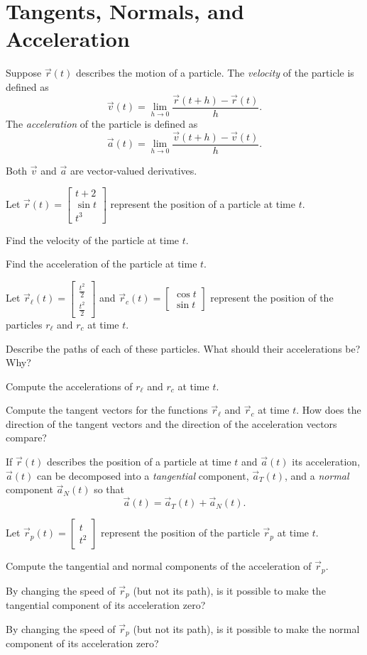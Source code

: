 \documentclass{problemset}
\newcommand{\mat}[1]{\begin{bmatrix}#1\end{bmatrix}}
\begin{document}
\section*{Tangents, Normals, and Acceleration}
	
	\begin{definition}
	Suppose $\vec r(t)$ describes the motion of a particle.  The \emph{velocity}
	of the particle is defined as
	\[
		\vec v(t) = \lim_{h\to 0} \frac{\vec r(t+h)-\vec r(t)}{h}.
	\]
	The \emph{acceleration}
	of the particle is defined as
	\[
		\vec a(t) = \lim_{h\to 0} \frac{\vec v(t+h)-\vec v(t)}{h}.
	\]
	\end{definition}
	Both $\vec v$ and $\vec a$ are vector-valued derivatives.

	\question
	Let $\vec r(t) = \mat{t+2\\ \sin t\\ t^3}$ represent the position of a particle at time $t$.
	\begin{parts}
		\item Find the velocity of the particle at time $t$.
		\item Find the acceleration of the particle at time $t$.
	\end{parts}

	\question
	Let $\vec r_\ell(t) = \mat{\frac{t^2}{2}\\\frac{t^2}{2}}$ and $\vec r_c(t) = \mat{\cos t\\ \sin t}$ represent the position
	of the particles $r_\ell$ and $r_c$ at time $t$.
	\begin{parts}
		\item Describe the paths of each of these particles.  What should their accelerations be?  Why?
		\item Compute the accelerations of $r_\ell$ and $r_c$ at time $t$.
		\item Compute the tangent vectors for the functions $\vec r_\ell$ and $\vec r_c$ at time $t$.
			How does the direction of the tangent vectors and the direction of the acceleration vectors
			compare?
	\end{parts}

	If $\vec r(t)$ describes the position of a particle at time $t$ and $\vec a(t)$ its acceleration, $\vec a(t)$
	can be decomposed into a \emph{tangential} component, $\vec a_T(t)$, and a \emph{normal} component $\vec a_N(t)$
	so that
	\[
		\vec a(t) = \vec a_T(t) +\vec a_N(t).
	\]

	\question
	Let $\vec r_{p}(t) = \mat{t\\ t^2}$  represent the position
	of the particle $\vec r_{p}$ at time $t$.
	\begin{parts}
		\item Compute the tangential and normal components of the acceleration of $\vec r_{p}$.
		\item By changing the speed of $\vec r_{p}$ (but not its path), is it possible to make 
			the tangential component of its acceleration zero?
		\item By changing the speed of $\vec r_{p}$ (but not its path), is it possible to make 
			the normal component of its acceleration zero?
	\end{parts}
\end{document}
